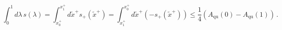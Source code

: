 \begin{equation}
\int_0^1 d\lambda \, s(\lambda) = \int_{x_0^+}^{x_1^+}
d\tilde{x}^+ s_+(\tilde{x}^+) 
=\int_{x_1^+}^{x_0^+} d\tilde{x}^+ \left(-s_+(\tilde{x}^+) \right) \leq
\frac{1}{4} \left( A_{\text{qu}}(0) -
A_{\text{qu}}(1) \right)\, . \label{eqqbb}
\end{equation}

